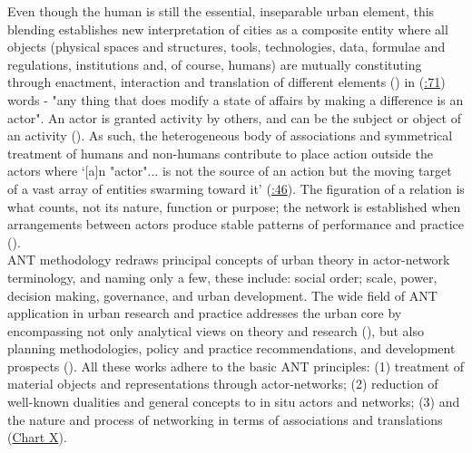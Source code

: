 \documentclass[11pt]{report}
\begin{document}
{{{{Even though the human is still the essential, inseparable urban element, this blending establishes new interpretation of cities as a composite entity where all objects (physical spaces and structures, tools, technologies, data, formulae and regulations, institutions and, of course, humans) are mutually constituting through enactment, interaction and translation of different elements (\href{Farias}{\citealt{farias_introduction:_2011}}) in  (\href{Latour}{\citealt{latour_reassembling_2005}:71}) words - "any thing that does modify a state of affairs by making a difference is an actor". An actor is granted activity by others, and can be the subject or object of an activity  (\href{Latour}{\citealt{latour_actor-network_1996}}). As such, the heterogeneous body of associations and symmetrical treatment of humans and non-humans contribute to place action outside the actors where ‘[a]n "actor"... is not the source of an action but the moving target of a vast array of entities swarming toward it’ (\href{Latour}{\citealt{latour_reassembling_2005}:46}). The figuration of a relation is what counts, not its nature, function or purpose; the network is established when arrangements between actors produce stable patterns of performance and practice (\href{Smith}{\citealt{smith_world_2003}}).
\\

ANT methodology redraws principal concepts of urban theory in actor-network terminology, and naming only a few, these include: social order; scale, power, decision making, governance, and urban development. The wide field of ANT application in urban research and practice addresses the urban core by encompassing not only analytical views on theory and research  (\href{Boelens}{\citealt{boelens_theorizing_2010}}), but also planning methodologies, policy and practice recommendations, and development prospects (\href{Healey}{\citealt{healey_circuits_2013}}). All these works adhere to the basic ANT principles: (1) treatment of material objects and representations through actor-networks; (2) reduction of well-known dualities and general concepts to in situ actors and networks; (3) and the nature and process of networking in terms of associations and translations (\href{Table ANT table}{Chart X}).
\\

}}}}
\end{document}
